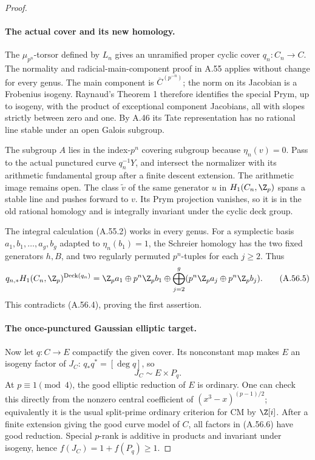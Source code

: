 \begin{proof}
\paragraph{The actual cover and its new homology.}
The \(\mu_{p^n}\)-torsor defined by \(L_n\) gives an
unramified proper cyclic cover \(q_n:C_n\to C\). The
normality and radicial-main-component proof in A.55 applies
without change for every genus. The main component is
\(\overline C^{(p^{-n})}\); the norm on its Jacobian is a
Frobenius isogeny. Raynaud's Theorem 1 therefore identifies
the special Prym, up to isogeny, with the product of
exceptional component Jacobians, all with slopes strictly
between zero and one. By A.46 its Tate representation has
no rational line stable under an open Galois subgroup.

The subgroup \(A\) lies in the index-\(p^n\) covering
subgroup because \(\eta_n(v)=0\). Pass to the actual
punctured curve \(q_n^{-1}Y\), and intersect the normalizer
with its arithmetic fundamental group after a finite
descent extension. The arithmetic image remains open.
The class \(\widetilde v\) of the same generator \(u\)
in \(H_1(C_n,\Z_p)\) spans a stable line and pushes
forward to \(v\). Its Prym projection vanishes, so it is
in the old rational homology and is integrally invariant
under the cyclic deck group.

The integral calculation (A.55.2) works in every genus.
For a symplectic basis \(a_1,b_1,\ldots,a_g,b_g\)
adapted to \(\eta_n(b_1)=1\), the Schreier homology has
the two fixed generators \(h,B\), and two regularly
permuted \(p^n\)-tuples for each \(j\ge2\). Thus
\[
 q_{n,*}H_1(C_n,\Z_p)^{\operatorname{Deck}(q_n)}
 =\Z_p a_1\oplus p^n\Z_p b_1
       \oplus\bigoplus_{j=2}^g
             (p^n\Z_p a_j\oplus p^n\Z_p b_j).         \tag{A.56.5}
\]
This contradicts (A.56.4), proving the first assertion.

\paragraph{The once-punctured Gaussian elliptic target.}
Now let \(q:C\to E\) compactify the given cover. Its
nonconstant map makes \(E\) an isogeny factor of \(J_C\):
\(q_*q^*=[\deg q]\), so
\[
                     J_C\sim E\times P_q.              \tag{A.56.6}
\]
At \(p\equiv1\pmod4\), the good elliptic reduction of
\(E\) is ordinary. One can check this directly from the
nonzero central coefficient of \((x^3-x)^{(p-1)/2}\);
equivalently it is the usual split-prime ordinary
criterion for CM by \(\Z[i]\).
After a finite extension giving the good curve model of
\(C\), all factors in (A.56.6) have good reduction.
Special \(p\)-rank is additive in products and invariant
under isogeny, hence
\(f(J_C)=1+f(P_q)\ge1\).


\end{proof}
